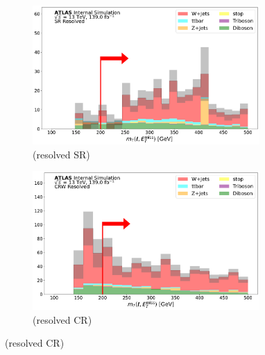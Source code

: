   \begin{figure}[htbp]
  \centering
     \begin{subfigure}{0.45\textwidth}
     \includegraphics[width = 0.95\textwidth]{Figures/App_SR_CR_distributions/SR1L_Resolved/mT_lep_met_N_1.pdf}
    \caption{\mtlepmet (resolved SR)}
     \end{subfigure}
    \begin{subfigure}{0.45\textwidth}
     \includegraphics[width = 0.95\textwidth]{Figures/App_SR_CR_distributions/CRW_Resolved/mT_lep_met_N_1.pdf}
     \caption{\mtlepmet (resolved \wjets CR)}
     \end{subfigure}


\end{figure}
